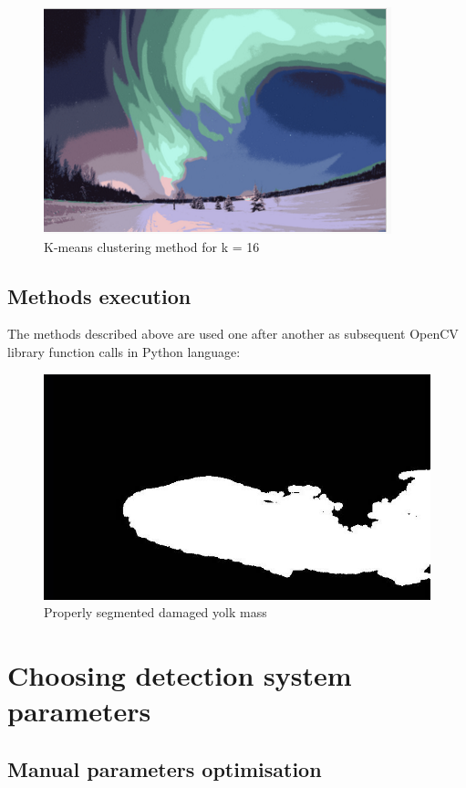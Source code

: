 \documentclass[12pt,twoside,a4paper]{article}
\begin{document}
\begin{figure}[H]
\centering
\includegraphics[width=0.4\paperwidth]{kmeans}
\caption{K-means clustering method for k = 16\cite{segm}}\label{fig:kmeans}
\end{figure}
\subsection{Methods execution}
The methods described above are used one after another as subsequent OpenCV library function calls in Python language:


\begin{figure}[H]
\centering
\includegraphics[width=0.4\paperwidth]{bad}
\caption{Properly segmented damaged yolk mass}\label{fig:bad}
\end{figure}

\section{Choosing detection system parameters}
\subsection{Manual parameters optimisation}
\end{document}
